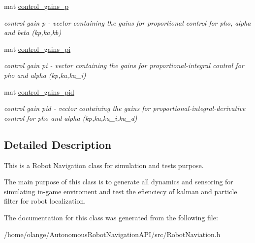 \begin{DoxyCompactItemize}
mat \hyperlink{class_robot_navigation_ad7ff88f46b33d23be62fc365b650361e}{control\+\_\+gains\+\_\+p}
\begin{DoxyCompactList}\small\item\em control gain p -\/ vector containing the gains for proportional control for pho, alpha and beta (kp,ka,kb) \end{DoxyCompactList}\item 
\mbox{\label{class_robot_navigation_a90738c7f4f1a884edce67e44769b284b}} 
mat \hyperlink{class_robot_navigation_a90738c7f4f1a884edce67e44769b284b}{control\+\_\+gains\+\_\+pi}
\begin{DoxyCompactList}\small\item\em control gain pi -\/ vector containing the gains for proportional-\/integral control for pho and alpha (kp,ka,ka\+\_\+i) \end{DoxyCompactList}\item 
\mbox{\label{class_robot_navigation_a0f450c83221af7ef3e276b65ebfdc50d}} 
mat \hyperlink{class_robot_navigation_a0f450c83221af7ef3e276b65ebfdc50d}{control\+\_\+gains\+\_\+pid}
\begin{DoxyCompactList}\small\item\em control gain pid -\/ vector containing the gains for proportional-\/integral-\/derivative control for pho and alpha (kp,ka,ka\+\_\+i,ka\+\_\+d) \end{DoxyCompactList}\end{DoxyCompactItemize}


\subsection{Detailed Description}
This is a Robot Navigation class for simulation and tests purpose. 

The main purpose of this class is to generate all dynamics and sensoring for simulating in-\/game enviroment and test the efienciecy of kalman and particle filter for robot localization. 

The documentation for this class was generated from the following file\+:\begin{DoxyCompactItemize}
\item 
/home/olange/\+Autonomous\+Robot\+Navigation\+A\+P\+I/src/Robot\+Naviation.\+h\end{DoxyCompactItemize}
